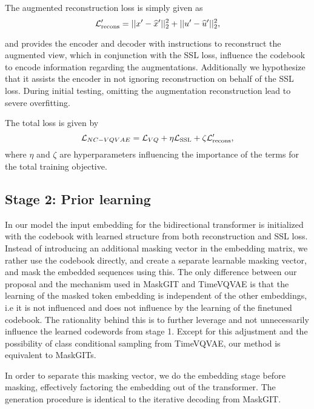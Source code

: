 \documentclass[../../thesis.tex]{subfiles}
\begin{document}
The augmented reconstruction loss is simply given as 
\begin{equation}
    \label{eq:NCVQVAE_augrecons}
        \mathcal{L}_\text{recons}' = ||x' - \widehat{x}' ||_2^2 + ||u' - \widehat{u}'||_2^2,
\end{equation}

and provides the encoder and decoder with instructions to reconstruct the augmented view, which in conjunction with the SSL loss, influence the codebook to encode information regarding the augmentations. Additionally we hypothesize that it assists the encoder in not ignoring reconstruction on behalf of the SSL loss. During initial testing, omitting the augmentation reconstruction lead to severe overfitting.\newline

The total loss is given by 
\begin{equation}
    \mathcal{L}_{NC-VQVAE} = \mathcal{L}_{VQ} + \eta\mathcal{L}_{\text{SSL}} + \zeta \mathcal{L}_\text{recons}',
\end{equation}
where $\eta$ and $\zeta$ are hyperparameters influencing the importance of the terms for the total training objective. 


\subsection{Stage 2: Prior learning}

In our model the input embedding for the bidirectional transformer is initialized with the codebook with learned structure from both reconstruction and SSL loss. Instead of introducing an additional masking vector in the embedding matrix, we rather use the codebook directly, and create a separate learnable masking vector, and mask the embedded sequences using this. The only difference between our proposal and the mechanism used in MaskGIT and TimeVQVAE is that the learning of the masked token embedding is independent of the other embeddings, i.e it is not influenced and does not influence by the learning of the finetuned codebook. The rationality behind this is to further leverage and not unnecessarily influence the learned codewords from stage 1. Except for this adjustment and the possibility of class conditional sampling from TimeVQVAE, our method is equivalent to MaskGITs.
\newline

In order to separate this masking vector, we do the embedding stage before masking, effectively factoring the embedding out of the transformer. The generation procedure is identical to the iterative decoding from MaskGIT. 
\end{document}
